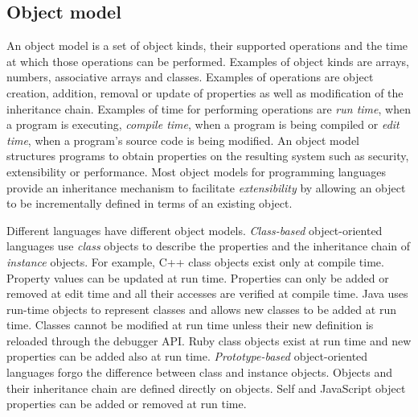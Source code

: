 
\subsection{Object model}

An object model is a set of object kinds, their supported operations and the
time at which those operations can be performed.  Examples of object kinds are
arrays, numbers, associative arrays and classes.  Examples of operations are
object creation, addition, removal or update of properties as well as
modification of the inheritance chain. Examples of time for performing
operations are \textit{run time}, when a program is executing, \textit{compile
time}, when a program is being compiled or \textit{edit time}, when a program's
source code is being modified. An object model structures programs to obtain
properties on the resulting system such as security, extensibility or
performance. Most object models for programming languages provide an
inheritance mechanism to facilitate \textit{extensibility} by allowing an object
to be incrementally defined in terms of an existing object.

Different languages have different object models. \textit{Class-based}
object-oriented languages use \textit{class} objects to describe the properties
and the inheritance chain of \textit{instance} objects. For example, C++ class
objects exist only at compile time. Property values can be updated at run time.
Properties can only be added or removed at edit time and all their accesses are
verified at compile time. Java uses run-time objects to represent classes and
allows new classes to be added at run time.  Classes cannot be modified at run
time unless their new definition is reloaded through the debugger API. Ruby
class objects exist at run time and new properties can be added also at run
time. \textit{Prototype-based} object-oriented languages forgo the difference
between class and instance objects. Objects and their inheritance chain are
defined directly on objects. Self and JavaScript object properties can be
added or removed at run time. 

